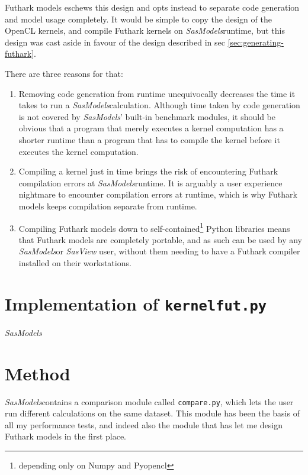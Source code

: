 \documentclass[11pt]{article}
\newcommand{\sasmodels}{\textit{SasModels}}
\newcommand{\sasview}{\textit{SasView}}
\begin{document}
Futhark models eschews this design and opts instead to separate code generation
and model usage completely.
It would be simple to copy the design of the OpenCL kernels, and compile Futhark
kernels on \sasmodels runtime, but this design was cast aside in favour of the
design described in sec \ref{sec:generating-futhark}.

There are three reasons for that:
\begin{enumerate}
  \item Removing code generation from runtime unequivocally decreases the time
  it takes to run a \sasmodels calculation. Although time taken by code 
  generation is not covered by \sasmodels' built-in benchmark modules, it should
  be obvious that a program that merely executes a kernel computation has a 
  shorter runtime than a program that has to compile the kernel before it
  executes the kernel computation.
  
  \item Compiling a kernel just in time brings the risk of encountering 
  Futhark compilation errors at \sasmodels runtime. 
  It is arguably a user experience nightmare to encounter compilation errors at 
  runtime, which is why Futhark models keeps compilation separate from runtime.
  
  \item Compiling Futhark models down to self-contained\footnote{depending only 
  on Numpy and Pyopencl} Python libraries means that Futhark models are 
  completely portable, and as such can be used by any \sasmodels or \sasview 
  user, without them needing to have a Futhark compiler installed on their 
  workstations.
\end{enumerate}

\section{Implementation of \texttt{kernelfut.py}}
\sasmodels 


\section{Method}

\sasmodels contains a comparison module called \texttt{compare.py}, which
lets the user run different calculations on the same dataset.
This module has been the basis of all my performance tests, and indeed also
the module that has let me design Futhark models in the first place.
\end{document}
